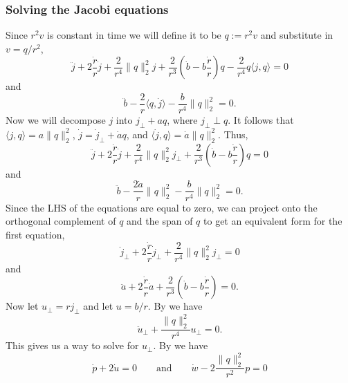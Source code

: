 \documentclass{article}
\begin{document}
\subsubsection{Solving the Jacobi equations}
Since $r^2v$ is constant in time we will define it to be $q := r^2v$ and substitute in $v = q/r^2$, 
\begin{equation}
    \ddot j +  2\frac{\dot r}{r}\dot j +\frac{2}{r^4}\|q\|_2^2j + \frac{2}{r^3}\left(\dot b - b\frac{ \dot r}{r}\right)q - \frac{2}{r^4}q\langle j, q\rangle = 0
\end{equation}
and 
\begin{equation}
    \ddot b - \frac{2}{r}\langle q, \dot j\rangle - \frac{b}{r^4} \|q\|_2^2 = 0.
\end{equation}
Now we will decompose $j$ into $j_{\perp} + aq$, where $j_{\perp} \perp q$. It follows that $\langle j, q\rangle = a\|q\|_2^2$, $\dot j = \dot j_{\perp} + \dot aq$, and $\langle \dot j, q\rangle = \dot a \|q\|_2^2$. Thus,
\begin{equation}
    \ddot j +  2\frac{\dot r}{r}\dot j +\frac{2}{r^4}\|q\|_2^2j_{\perp} + \frac{2}{r^3}\left(\dot b - b\frac{ \dot r}{r}\right)q = 0
\end{equation}
and 
\begin{equation}
    \ddot b - \frac{2\dot a}{r}\|q\|_2^2 - \frac{b}{r^4} \|q\|_2^2 = 0.
\end{equation}
Since the LHS of the equations are equal to zero, we can project onto the orthogonal complement of $q$ and the span of $q$ to get an equivalent form for the first equation,
\begin{equation}
    \ddot j_{\perp} +  2\frac{\dot r}{r}\dot j_{\perp} +\frac{2}{r^4}\|q\|_2^2j_{\perp} = 0
\end{equation}
and 
\begin{equation}
    \ddot a + 2\frac{\dot r}{r}\dot a + \frac{2}{r^3}\left(\dot b - b\frac{ \dot r}{r}\right) = 0.
\end{equation}
Now let $u_\perp = rj_\perp$ and let $u = b/r$. By  we have
\begin{equation} 
    \ddot u_{\perp} + \frac{\|q\|_2^2}{r^4}u_\perp = 0.
\end{equation}
This gives us a way to solve for $u_\perp$. By  we have
\begin{equation} \label{eq: p and w ode}
    \dot p + 2\dot u = 0 \qquad \text{and} \qquad \dot w - 2\frac{\|q\|_2^2}{r^2}p = 0
\end{equation}
\end{document}
